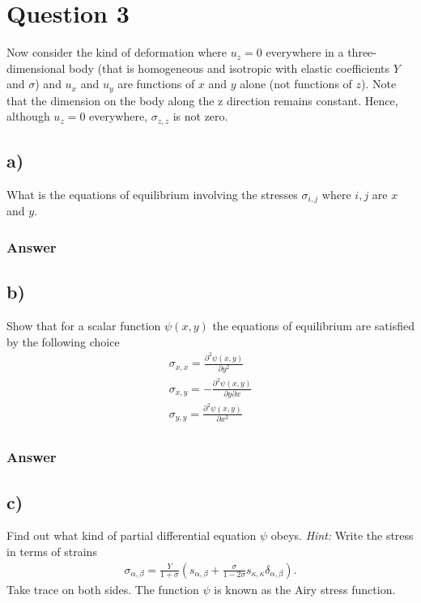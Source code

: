 \documentclass{article}
\begin{document}
\section*{Question 3}
Now consider the kind of deformation where $u_z = 0$ everywhere in a three-dimensional body (that is homogeneous and isotropic with elastic coefficients $Y$ and $\sigma$) and $u_x$ and $u_y$ are functions of $x$ and $y$ alone (not functions of $z$). Note that the dimension on the body along the z direction remains constant. Hence, although $u_z = 0$ everywhere, $\sigma_{z,z}$ is not zero.
\subsection*{a)}
What is the equations of equilibrium involving the stresses $\sigma_{i,j}$ where $i,j$ are $x$ and $y$.

\subsubsection*{Answer}

\subsection*{b)}
Show that for a scalar function $\psi(x,y)$ the equations of equilibrium are satisfied by the following choice
\begin{align}
    \sigma_{x,x} = \frac{\partial^2\psi(x,y)}{\partial y^2}\\
    \sigma_{x,y} = -\frac{\partial^2\psi(x,y)}{\partial y\partial x}\\
    \sigma_{y,y} = \frac{\partial^2\psi(x,y)}{\partial x^2}\\
\end{align}

\subsubsection*{Answer}
\subsection*{c)}
Find out what kind of partial differential equation $\psi$ obeys. \textit{Hint:} Write the stress in terms of strains
\begin{align*}
    \sigma_{\alpha, \beta} = \frac{Y}{1+\sigma}\left(s_{\alpha,\beta} + \frac{\sigma}{1-2\sigma}s_{\kappa, \kappa}\delta_{\alpha,\beta}\right).
\end{align*}Take trace on both sides. The function $\psi$ is known as the Airy stress function.
\end{document}
